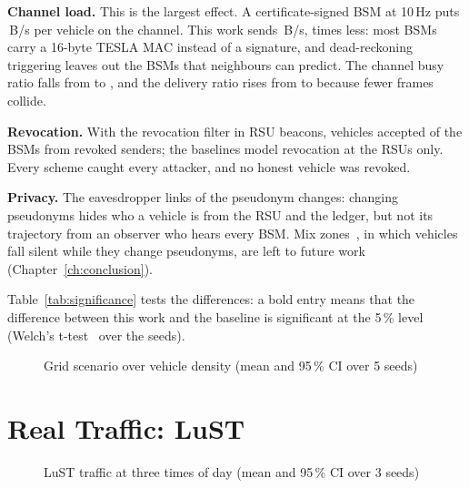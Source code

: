 \textbf{Channel load.} This is the largest effect. A certificate-signed BSM at 10\,Hz puts
\,B/s per vehicle on the channel. This work sends
\,B/s,  times less: most
BSMs carry a 16-byte TESLA MAC instead of a signature, and dead-reckoning~\cite{etsi302637} triggering leaves out the
BSMs that neighbours can predict. The channel busy ratio falls from
 to , and the delivery ratio rises from
 to  because fewer frames collide.

\textbf{Revocation.} With the revocation filter in RSU beacons, vehicles accepted
 of the BSMs from revoked senders; the baselines model
revocation at the RSUs only. Every scheme caught every attacker, and no honest vehicle was revoked.

\textbf{Privacy.} The eavesdropper links  of the pseudonym changes:
changing pseudonyms hides who a vehicle is from the RSU and the ledger, but not its trajectory from
an observer who hears every BSM. Mix zones~\cite{beresford2003mix,freudiger2007mix}, in which vehicles fall silent while they change
pseudonyms, are left to future work (Chapter~\ref{ch:conclusion}).


Table~\ref{tab:significance} tests the differences: a bold entry means that the difference between
this work and the baseline is significant at the 5\,\% level (Welch's t-test~\cite{welch1947} over the seeds).

\begin{figure}[htbp]\centering
{}
\caption{Grid scenario over vehicle density (mean and 95\,\% CI over 5 seeds)}\label{fig:grid}
\end{figure}


\section{Real Traffic: LuST}\label{sec:res-lust}


\begin{figure}[htbp]\centering
{}
\caption{LuST traffic at three times of day (mean and 95\,\% CI over 3 seeds)}\label{fig:lust}
\end{figure}

